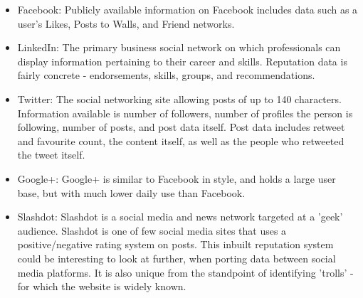 \begin{itemize}

\item Facebook: Publicly available information on Facebook includes data such as a user's Likes, Posts to Walls, and Friend networks. 
\item LinkedIn: The primary business social network on which professionals can display information pertaining to their career and skills. Reputation data is fairly concrete - endorsements, skills, groups, and recommendations. 
\item Twitter: The social networking site allowing posts of up to 140 characters. Information available is number of followers, number of profiles the person is following, number of posts, and post data itself. Post data includes retweet and favourite count, the content itself, as well as the people who retweeted the tweet itself. 
\item Google+: Google+ is similar to Facebook in style, and holds a large user base, but with much lower daily use than Facebook.
\item Slashdot: Slashdot is a social media and news network targeted at a 'geek' audience. Slashdot is one of few social media sites that uses a positive/negative rating system on posts. This inbuilt reputation system could be interesting to look at further, when porting data between social media platforms. It is also unique from the standpoint of identifying 'trolls' - for which the website is widely known. 
\end{itemize}

